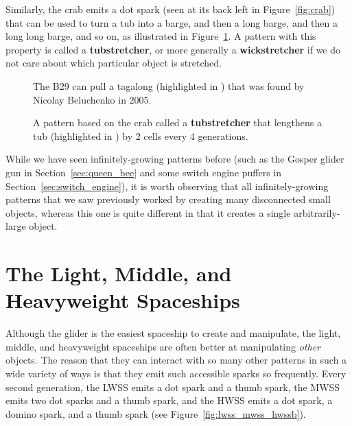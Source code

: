 Similarly, the crab emits a dot spark (seen at its back left in Figure~\ref{fig:crab}) that can be used to turn a tub into a barge, and then a long barge, and then a long long barge, and so on, as illustrated in Figure~\ref{fig:tubstretcher}. A pattern with this property is called a \textbf{tubstretcher}, or more generally a \textbf{wickstretcher} if we do not care about which particular object is stretched.

\begin{figure}[!htb]
	\centering
	\begin{minipage}[b]{.37\textwidth}
		\centering
		\caption{The B29 can pull a tagalong (highlighted in ) that was found by Nicolay Beluchenko in 2005.}\label{fig:b29_tagalong}
	\end{minipage} \hfill %
	\begin{minipage}[b]{.59\textwidth}
		\centering
		\caption{A pattern based on the crab called a \textbf{tubstretcher} that lengthens a tub (highlighted in ) by $2$ cells every $4$ generations.}\label{fig:tubstretcher}
	\end{minipage}
\end{figure}

While we have seen infinitely-growing patterns before (such as the Gosper glider gun in Section~\ref{sec:queen_bee} and some switch engine puffers in Section~\ref{sec:switch_engine}), it is worth observing that all infinitely-growing patterns that we saw previously worked by creating many disconnected small objects, whereas this one is quite different in that it creates a single arbitrarily-large object.



\section{The Light, Middle, and Heavyweight Spaceships}\label{sec:lwss_mwss_hwss}

Although the glider is the easiest spaceship to create and manipulate, the light, middle, and heavyweight spaceships are often better at manipulating \emph{other} objects. The reason that they can interact with so many other patterns in such a wide variety of ways is that they emit such accessible sparks so frequently. Every second generation, the LWSS emits a dot spark and a thumb spark, the MWSS emits two dot sparks and a thumb spark, and the HWSS emits a dot spark, a domino spark, and a thumb spark (see Figure~\ref{fig:lwss_mwss_hwssb}).

